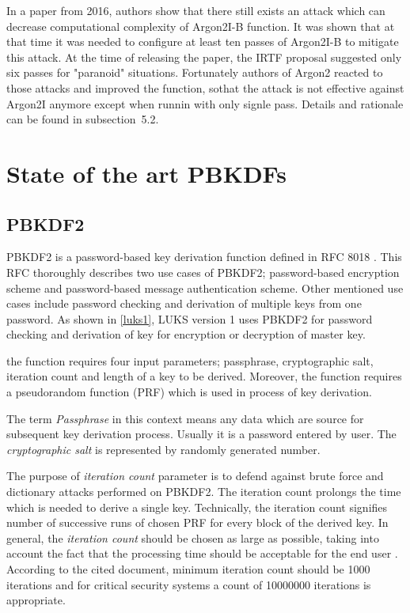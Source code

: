 \documentclass[nolof]{fithesis3}
\begin{document}
In a paper from 2016, authors show that there still exists an attack which can decrease computational complexity of Argon2I-B function. It was shown that at that time it was needed to configure at least ten passes of Argon2I-B to mitigate this attack. At the time of releasing the paper, the IRTF proposal suggested only six passes for "paranoid" situations. Fortunately authors of Argon2 reacted to those attacks and improved the function, sothat the attack is not effective against Argon2I anymore except when runnin with only signle pass. Details and rationale can be found in \parencite{argon2}{subsection~5.2}.

\chapter{State of the art PBKDFs}
\label{chap:pbkdfs}


\section{PBKDF2}
\label{sec:pbkdf2}

PBKDF2 is a password-based key derivation function defined in RFC 8018 \parencite{rfc8018}. This RFC thoroughly describes two use cases of PBKDF2; password-based encryption scheme and password-based message authentication scheme. Other mentioned use cases include password checking and derivation of multiple keys from one password. As shown in \ref{luks1}, LUKS version 1 uses PBKDF2 for password checking and derivation of key for encryption or decryption of master key.

the function requires four input parameters; passphrase, cryptographic salt, iteration count and length of a key to be derived. Moreover, the function requires a pseudorandom function (PRF) which is used in process of key derivation.

The term \emph{Passphrase} in this context means any data which are source for subsequent key derivation process. Usually it is a password entered by user. The \emph{cryptographic salt} is represented by randomly generated number.

The purpose of \emph{iteration count} parameter is to defend against brute force and dictionary attacks performed on PBKDF2. The iteration count prolongs the time which is needed to derive a single key. Technically, the iteration count signifies number of successive runs of chosen PRF for every block of the derived key. In general, the \emph{iteration count} should be chosen as large as possible, taking into account the fact that the processing time should be acceptable for the end user \parencite{nistpbkdf2}. According to the cited document, minimum iteration count should be 1000 iterations and for critical security systems a count of 10000000 iterations is appropriate. 
\end{document}
